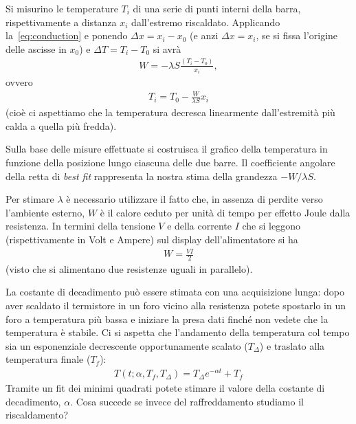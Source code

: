 \documentclass{lab1-article}
\begin{document}
\begin{article}

Si misurino le temperature $T_i$ di una serie di punti interni della barra,
rispettivamente a distanza $x_i$ dall'estremo riscaldato. Applicando
la~\eqref{eq:conduction} e ponendo $\Delta x = x_i - x_0$ (e anzi
$\Delta x = x_i$, se si fissa l’origine delle ascisse in $x_0$) e
$\Delta T = T_i - T_0$ si avr\`a
\begin{align}
  W = -\lambda S \frac{(T_i - T_0)}{x_i},
\end{align}
ovvero
\begin{align}
  T_i = T_0 - \frac{W}{\lambda S} x_i
\end{align}
(cio\`e ci aspettiamo che la temperatura decresca linearmente dall'estremit\`a
pi\`u calda a quella pi\`u fredda).



Sulla base delle misure effettuate si costruisca il grafico della temperatura
in funzione della posizione lungo ciascuna delle due barre.
Il coefficiente angolare della retta di \emph{best fit} rappresenta la nostra
stima della grandezza $-W/\lambda S$.

Per stimare $\lambda$ \`e necessario utilizzare il fatto che, in assenza di
perdite verso l'ambiente esterno, $W$ \`e il calore ceduto per unit\`a di tempo per effetto Joule
dalla resistenza. In termini della tensione $V$ e della corrente $I$ che si
leggono (rispettivamente in Volt e Ampere) sul display dell'alimentatore si ha
\begin{align}
  W = \frac{V I}{2}
\end{align}
(visto che si alimentano due resistenze uguali in parallelo).



\plasduinosave

La costante di decadimento pu\`o essere stimata con una acquisizione lunga:
dopo aver scaldato il termistore in un foro vicino alla resistenza 
potete spostarlo in un foro a temperatura pi\`u bassa
e iniziare la presa dati finch\'e non vedete che la temperatura \`e stabile.
Ci si aspetta che l'andamento della temperatura col tempo sia un esponenziale decrescente
opportunamente scalato ($T_{\Delta}$) e traslato alla temperatura finale ($T_f$):
\begin{align}
  T(t; \alpha, T_f, T_{\Delta}) = T_{\Delta} e^{-\alpha t} + T_f
\end{align}
Tramite un fit dei minimi quadrati potete stimare il valore della costante di decadimento, $\alpha$.
Cosa succede se invece del raffreddamento studiamo il riscaldamento?


\end{article}
\end{document}
